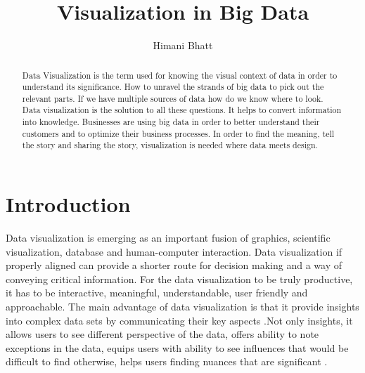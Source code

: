 

%



\title{Visualization in Big Data}


\author{Himani Bhatt}



\renewcommand{\shortauthors}{H. Bhatt}



\begin{abstract}
Data Visualization is the term used for knowing the visual context of data in order to understand its significance. How to unravel the strands of big data to pick out the relevant parts. If we have multiple sources of data how do we know where to look. Data visualization is the solution to all these questions. It helps to convert information into knowledge. Businesses are using big data in order to better understand their customers and to optimize their business processes. In order to find the meaning, tell the story and sharing the story, visualization is needed where data meets design.
\end{abstract}


\maketitle

\section{Introduction} 

Data visualization is emerging as an important fusion of graphics, scientific visualization, database and human-computer interaction. Data visualization if properly aligned can provide a shorter route for decision making and a way of conveying critical information. For the data visualization to be truly productive, it has to be interactive, meaningful, understandable, user friendly and approachable. The main advantage of data visualization is that it provide insights into complex data sets by communicating their key aspects \cite{Intro01}.Not only insights, it allows users to see different perspective of the data, offers ability to note exceptions in the data, equips users with ability to see influences that would be difficult to find otherwise, helps users finding nuances that are significant \cite{Intro02}. \\

